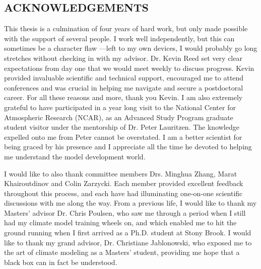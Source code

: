 \documentclass[12pt]{article}
\begin{document}
\newpage
\begin{center}
\section*{\bf{\normalsize ACKNOWLEDGEMENTS}}
\end{center}
\vspace*{4\baselineskip}
This thesis is a culmination of four years of hard work, but only made possible with the support of several people. I work well independently, but this can sometimes be a character flaw ---left to my own devices, I would probably go long stretches without checking in with my advisor. Dr. Kevin Reed set very clear expectations from day one that we would meet weekly to discuss progress. Kevin provided invaluable scientific and technical support, encouraged me to attend conferences and was crucial in helping me navigate and secure a postdoctoral career. For all these reasons and more, thank you Kevin. I am also extremely grateful to have participated in a year long visit to the National Center for Atmospheric Research (NCAR), as an Advanced Study Program graduate student visitor under the mentorship of Dr. Peter Lauritzen. The knowledge expelled onto me from Peter cannot be overstated. I am a better scientist for being graced by his presence and I appreciate all the time he devoted to helping me understand the model development world.

I would like to also thank committee members Drs. Minghua Zhang, Marat Khairoutdinov and Colin Zarzycki. Each member provided excellent feedback throughout this process, and each have had illuminating one-on-one scientific discussions with me along the way. From a previous life, I would like to thank my Masters' advisor Dr. Chris Poulsen, who saw me through a period when I still had my climate model training wheels on, and which enabled me to hit the ground running when I first arrived as a Ph.D. student at Stony Brook. I would like to thank my grand advisor, Dr. Christiane Jablonowski, who exposed me to the art of climate modeling as a Masters' student, providing me hope that a black box can in fact be understood.
\end{document}
